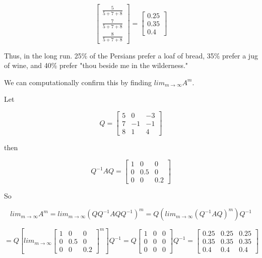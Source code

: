 \documentclass{amsart}
\theoremstyle{definition}
\theoremstyle{remark}
\numberwithin{equation}{section}
\begin{document}
\[  \begin{bmatrix}
\frac{5}{5 + 7 + 8} \\
\frac{7}{5 + 7 + 8}\\
\frac{8}{5 + 7 + 8}
\end{bmatrix}
%
=
\begin{bmatrix}{}
0.25 \\
0.35 \\
0.4
\end{bmatrix}
\]

Thus, in the long run. 25\% of the Persians prefer a loaf of bread, 35\% prefer a jug of wine, and 40\% prefer "thou beside me in the wilderness."

We can computationally confirm this by finding $lim_{m \to \infty}A^m$.

Let

\begin{equation}
    Q = \begin{bmatrix}
           5 & 0 & -3  \\
           7 & -1 & -1 \\
           8 & 1 & 4
         \end{bmatrix}
\end{equation}


then

\begin{equation}
    Q^{-1}AQ = \begin{bmatrix}
           1 & 0 & 0  \\
           0 & 0.5 & 0 \\
           0 & 0 & 0.2
         \end{bmatrix}
\end{equation}

So

\[
lim_{m \to \infty}A^m =
lim_{m \to \infty}(QQ^{-1}AQQ^{-1})^m =
Q(lim_{m \to \infty}(Q^{-1}AQ)^m)Q^{-1} \]

\[
= Q \left[ lim_{m \to \infty}
\begin{bmatrix}
   1 & 0 & 0  \\
   0 & 0.5 & 0 \\
   0 & 0 & 0.2
 \end{bmatrix}^m \right] Q^{-1}
 =
Q
\begin{bmatrix}
   1 & 0 & 0  \\
   0 & 0 & 0 \\
   0 & 0 & 0
 \end{bmatrix} Q^{-1}
 =
 \begin{bmatrix}{}
0.25 & 0.25 & 0.25 \\
0.35 & 0.35 & 0.35\\
0.4 & 0.4 & 0.4
\end{bmatrix}
\]
\end{document}
